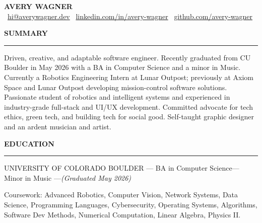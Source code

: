 \documentclass[10pt,letterpaper,ragged2e,withhyper]{altacv}
\newcommand{\headingfont}{\bfseries}
\renewcommand{\namefont}{\bfseries\fontsize{20}{30}\selectfont}
\newcommand{\education}[4]{
  \textcolor{subheading}{\MakeUppercase{#1}} \hspace{0.2cm}--- \hspace{0.2cm}#3\hspace{0.2cm}--- \hspace{0.2cm}#4 \hspace{0.2cm}—\hspace{0.2cm}\emph{(#2)}
  \vspace{4pt}  %
}
\begin{document}
\renewcommand{\cvsection}[1]{%
  \vspace{0.8em}
  {\headingfont\bfseries\color{heading}\MakeUppercase{#1}}\\[-2pt]
  {\color{accent}\rule{\linewidth}{0.4pt}}%
  \vspace{0.4em}
}


\begin{center}
  {\namefont\color{name}\MakeUppercase{Avery Wagner}}\\[4pt]

  {\small
    \faEnvelope\ \href{mailto:hi@averywagner.dev}{hi@averywagner.dev} \quad\textbullet\quad
    \faLinkedin\ \href{https://linkedin.com/in/avery-wagner}{linkedin.com/in/avery-wagner} \quad\textbullet\quad
    \faGithub\ \href{https://github.com/avery-wagner}{github.com/avery-wagner}
  }
\end{center}



\cvsection{SUMMARY}
Driven, creative, and adaptable software engineer. Recently graduated from CU Boulder in May 2026 with a BA in Computer Science and a minor in Music. Currently a Robotics Engineering Intern at Lunar Outpost; previously at Axiom Space and Lunar Outpost developing mission-control software solutions. Passionate student of robotics and intelligent systems and experienced in industry-grade full-stack and UI/UX development. Committed advocate for tech ethics, green tech, and building tech for social good. Self-taught graphic designer and an ardent musician and artist.


\cvsection{EDUCATION}
\education
  {University of Colorado Boulder}
  {Graduated May 2026}
  {BA in Computer Science}
  {Minor in Music}

Coursework: Advanced Robotics, Computer Vision, Network Systems, Data Science, Programming Languages, Cybersecurity, Operating Systems, Algorithms, Software Dev Methods, Numerical Computation, Linear Algebra, Physics II.

\vspace{0.3em}
\end{document}
